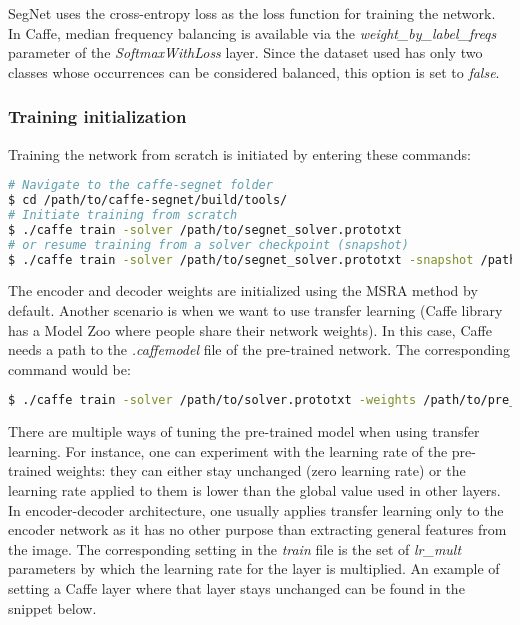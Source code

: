 
SegNet uses the cross-entropy loss as the loss function for training the network. In Caffe, median frequency balancing is available via the \textit{weight\_by\_label\_freqs} parameter of the \textit{SoftmaxWithLoss} layer. Since the dataset used has only two classes whose occurrences can be considered balanced, this option is set to \textit{false}. 

\subsubsection{Training initialization}

\noindent Training the network from scratch is initiated by entering these commands:

\begin{lstlisting}[language=bash]
# Navigate to the caffe-segnet folder
$ cd /path/to/caffe-segnet/build/tools/
# Initiate training from scratch
$ ./caffe train -solver /path/to/segnet_solver.prototxt
# or resume training from a solver checkpoint (snapshot)
$ ./caffe train -solver /path/to/segnet_solver.prototxt -snapshot /path/to/snapshot_iter_XY.solverstate
\end{lstlisting}

The encoder and decoder weights are initialized using the MSRA method by default. Another scenario is when we want to use transfer learning (Caffe library has a Model Zoo where people share their network weights). In this case, Caffe needs a path to the \textit{.caffemodel} file of the pre-trained network. The corresponding command would be:

\begin{lstlisting}[language=bash]
$ ./caffe train -solver /path/to/solver.prototxt -weights /path/to/pre_trained_weights.caffemodel
\end{lstlisting}

There are multiple ways of tuning the pre-trained model when using transfer learning. For instance, one can experiment with the learning rate of the pre-trained weights: they can either stay unchanged (zero learning rate) or the learning rate applied to them is lower than the global value used in other layers. \cite{stanford-github} In encoder-decoder architecture, one usually applies transfer learning only to the encoder network as it has no other purpose than extracting general features from the image. The corresponding setting in the \textit{train} file is the set of \textit{lr\_mult} parameters by which the learning rate for the layer is multiplied. An example of setting a Caffe layer where that layer stays unchanged can be found in the snippet below.

